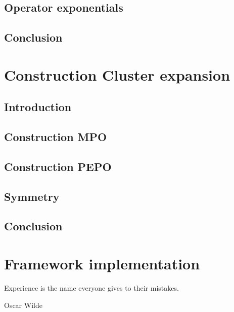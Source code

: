 \documentclass{book}
\newcounter{a}
\newcounter{b}
\begin{document}
\section{Operator exponentials}


\section{Conclusion}


\chapter{Construction Cluster expansion} \label{chap4}

\section{Introduction}


\section{Construction MPO}\label{H4_mpo_cons}


\section{Construction PEPO}\label{H4_pepo_cons}


\section{Symmetry}\label{sec:symm}


\section{Conclusion}


\chapter{Framework implementation}\label{chap5}



\epigraph{Experience is the name everyone gives to their mistakes.}{Oscar Wilde}
\end{document}
